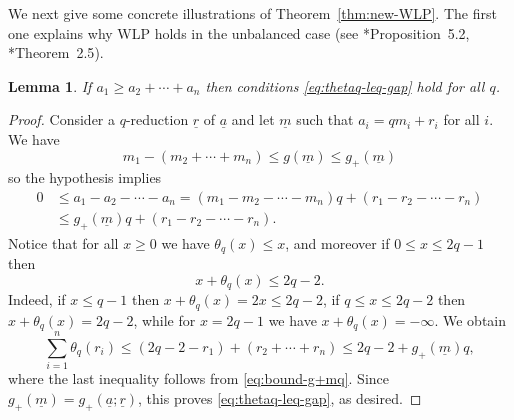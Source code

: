 \documentclass[11pt,reqno]{amsart}
\newcommand{\ul}[1]{\underline{#1}}
\newtheorem{lemma}[theorem]{Lemma}
\theoremstyle{definition}
\theoremstyle{remark}
\numberwithin{equation}{section}
\begin{document}
We next give some concrete illustrations of Theorem~\ref{thm:new-WLP}. The first one explains why WLP holds in the unbalanced case (see \cite{mig-mr}*{Proposition~5.2}, \cite{lund-nick}*{Theorem~2.5}).

\begin{lemma}\label{lem:gap-conditions-unbalanced}
    If $a_1\geq a_2+\cdots+a_n$ then conditions \eqref{eq:thetaq-leq-gap} hold for all $q$.
\end{lemma}

\begin{proof}
Consider a $q$-reduction $\ul{r}$ of $\ul{a}$ and let $\ul{m}$ such that $a_i = qm_i + r_i$ for all $i$. We have
\[ m_1 - (m_2+\cdots+m_n) \leq g(\ul{m}) \leq g_+(\ul{m})\]
so the hypothesis implies
\begin{equation}\label{eq:bound-g+mq}
\begin{aligned}
0 &\leq a_1-a_2-\cdots-a_n = (m_1-m_2-\cdots-m_n)q+(r_1-r_2-\cdots-r_n) \\
&\leq g_+(\ul{m})q+(r_1-r_2-\cdots-r_n).
\end{aligned}
\end{equation}
Notice that for all $x\geq 0$ we have $\theta_q(x)\leq x$, and moreover if $0\leq x\leq 2q-1$ then
\[ x + \theta_q(x) \leq 2q-2.\]
Indeed, if $x\leq q-1$ then $x + \theta_q(x)=2x\leq 2q-2$, if $q\leq x\leq 2q-2$ then $x+\theta_q(x)=2q-2$, while for $x=2q-1$ we have $x+\theta_q(x)=-\infty$. We obtain
\[\sum_{i=1}^n\theta_q(r_i) \leq (2q-2-r_1) + (r_2+\cdots+r_n) \leq 2q-2 + g_+(\ul{m})q,\]
where the last inequality follows from \eqref{eq:bound-g+mq}. Since $g_+(\ul{m})=g_+(\ul{a};\ul{r})$, this proves \eqref{eq:thetaq-leq-gap}, as desired.
\end{proof}
\end{document}

